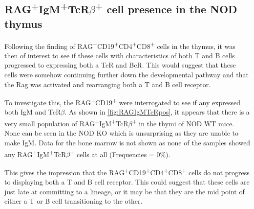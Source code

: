 \subsection{RAG\textsuperscript{+}IgM\textsuperscript{+}TcR$\beta$\textsuperscript{+} cell presence in the NOD thymus}

Following the finding of RAG\textsuperscript{+}CD19\textsuperscript{+}CD4\textsuperscript{+}CD8\textsuperscript{+} cells in the thymus, it was then of interest to see if these cells with characteristics of both T and B cells progressed to expressing both a TcR and BcR.
This would suggest that these cells were somehow continuing further down the developmental pathway and that the Rag was activated and rearranging both a T and B cell receptor.

To investigate this, the RAG\textsuperscript{+}CD19\textsuperscript{+} were interrogated to see if any expressed both IgM and TcR$\beta$.
As shown in \cref{fig:RAGIgMTcRpos}, it appears that there is a very small population of RAG\textsuperscript{+}IgM\textsuperscript{+}TcR$\beta$\textsuperscript{+} in the thymi of NOD WT mice.
None can be seen in the NOD KO which is unsurprising as they are unable to make IgM.
Data for the bone marrow is not shown as none of the samples showed any RAG\textsuperscript{+}IgM\textsuperscript{+}TcR$\beta$\textsuperscript{+} cells at all (Frequencies = 0\%).

This gives the impression that the RAG\textsuperscript{+}CD19\textsuperscript{+}CD4\textsuperscript{+}CD8\textsuperscript{+} cells do not progress to displaying both a T and B cell receptor.
This could suggest that these cells are just late at committing to a lineage, or it may be that they are the mid point of either a T or B cell transitioning to the other.


